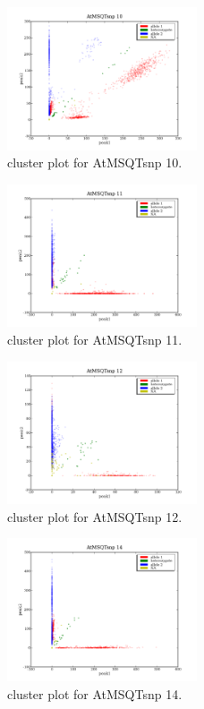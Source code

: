 \begin{figure}[H]
\includegraphics[width=0.5\textwidth]{figures/cluster_plot_AtMSQTsnp_10.png}
\caption{cluster plot for AtMSQTsnp 10.} \label{flAtMSQTsnp10}
\end{figure}
\begin{figure}[H]
\includegraphics[width=0.5\textwidth]{figures/cluster_plot_AtMSQTsnp_11.png}
\caption{cluster plot for AtMSQTsnp 11.} \label{flAtMSQTsnp11}
\end{figure}
\begin{figure}[H]
\includegraphics[width=0.5\textwidth]{figures/cluster_plot_AtMSQTsnp_12.png}
\caption{cluster plot for AtMSQTsnp 12.} \label{flAtMSQTsnp12}
\end{figure}
\begin{figure}[H]
\includegraphics[width=0.5\textwidth]{figures/cluster_plot_AtMSQTsnp_14.png}
\caption{cluster plot for AtMSQTsnp 14.} \label{flAtMSQTsnp14}
\end{figure}
